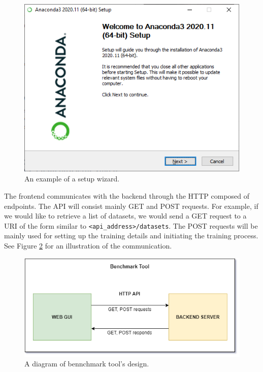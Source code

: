 \begin{figure}[h]
    \centering
    \includegraphics[width=0.65\linewidth]{Sources/Figures/anaconda.png}
    \caption{An example of a setup wizard.}
    \label{fig:wizard}
\end{figure}

The frontend communicates with the backend through the HTTP  composed of 
endpoints. The API will consist mainly GET and POST requests. For example, if we
would like to retrieve a list of datasets, we would send a GET request to a URI
of the form similar to \texttt{<api\_address>/datasets}. The POST requests will
be mainly used for setting up the training details and initiating the training
process. See Figure \ref{fig:tool_design} for an illustration of the communication.

\begin{figure}[h]
    \centering
    \includegraphics[width=0.85\linewidth]{Sources/Figures/tool_design.png}
    \caption{A diagram of bennchmark tool's design.}
    \label{fig:tool_design}
\end{figure}

